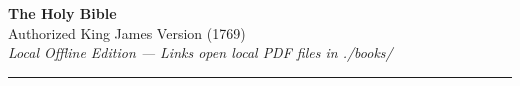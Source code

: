 \documentclass[10pt,letterpaper]{article}
\begin{document}


\pagestyle{empty}

\begin{center}
    {\LARGE\bfseries The Holy Bible}\\[0.2em]
    {\normalsize Authorized King James Version (1769)}\\[0.25em]
    {\footnotesize\itshape Local Offline Edition --- Links open local PDF files in ./books/}\\[0.4em]
    \rule{0.85\linewidth}{0.4pt}
\end{center}

\vspace{-0.2em}

\noindent
\end{document}
